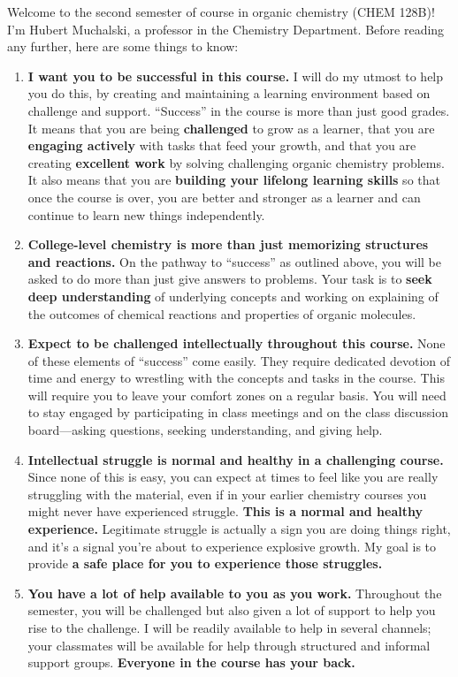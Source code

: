 Welcome to the second semester of course in organic chemistry (CHEM
128B)! I'm Hubert Muchalski, a professor in the Chemistry Department.
Before reading any further, here are some things to know:

\begin{enumerate}
\def\labelenumi{\arabic{enumi}.}
\tightlist
\item
  \textbf{I want you to be successful in this course.} I will do my
  utmost to help you do this, by creating and maintaining a learning
  environment based on challenge and support. ``Success'' in the course
  is more than just good grades. It means that you are being
  \textbf{challenged} to grow as a learner, that you are
  \textbf{engaging actively} with tasks that feed your growth, and that
  you are creating \textbf{excellent work} by solving challenging
  organic chemistry problems. It also means that you are
  \textbf{building your lifelong learning skills} so that once the
  course is over, you are better and stronger as a learner and can
  continue to learn new things independently.
\item
  \textbf{College-level chemistry is more than just memorizing
  structures and reactions.} On the pathway to ``success'' as outlined
  above, you will be asked to do more than just give answers to
  problems. Your task is to \textbf{seek deep understanding} of
  underlying concepts and working on explaining of the outcomes of
  chemical reactions and properties of organic molecules.
\item
  \textbf{Expect to be challenged intellectually throughout this
  course.} None of these elements of ``success'' come easily. They
  require dedicated devotion of time and energy to wrestling with the
  concepts and tasks in the course. This will require you to leave your
  comfort zones on a regular basis. You will need to stay engaged by
  participating in class meetings and on the class discussion
  board---asking questions, seeking understanding, and giving help.
\item
  \textbf{Intellectual struggle is normal and healthy in a challenging
  course.} Since none of this is easy, you can expect at times to feel
  like you are really struggling with the material, even if in your
  earlier chemistry courses you might never have experienced struggle.
  \textbf{This is a normal and healthy experience.} Legitimate struggle
  is actually a sign you are doing things right, and it's a signal
  you're about to experience explosive growth. My goal is to provide
  \textbf{a safe place for you to experience those struggles.}
\item
  \textbf{You have a lot of help available to you as you work.}
  Throughout the semester, you will be challenged but also given a lot
  of support to help you rise to the challenge. I will be readily
  available to help in several channels; your classmates will be
  available for help through structured and informal support groups.
  \textbf{Everyone in the course has your back.}
\end{enumerate}

